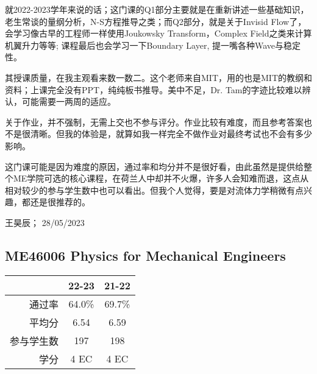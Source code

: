 就2022-2023学年来说的话；这门课的Q1部分主要就是在重新讲述一些基础知识，老生常谈的量纲分析，N-S方程推导之类；而Q2部分，就是关于Invisid Flow了，会学习像古早的工程师一样使用Joukowsky Transform，Complex Field之类来计算机翼升力等等; 课程最后也会学习一下Boundary Layer, 提一嘴各种Wave与稳定性。

其授课质量，在我主观看来数一数二。这个老师来自MIT，用的也是MIT的教纲和资料；上课完全没有PPT，纯纯板书推导。美中不足，Dr. Tam的字迹比较难以辨认，可能需要一两周的适应。

关于作业，并不强制，无需上交也不参与评分。作业比较有难度，而且参考答案也不是很清晰。但我的体验是，就算如我一样完全不做作业对最终考试也不会有多少影响。

这门课可能是因为难度的原因，通过率和均分并不是很好看，由此虽然是提供给整个ME学院可选的核心课程，在荷兰人中却并不火爆，许多人会知难而退，这点从相对较少的参与学生数中也可以看出。但我个人觉得，要是对流体力学稍微有点兴趣，都还是很推荐的。

\begin{flushright}
王昊辰； 28/05/2023
\end{flushright}



\subsection{ME46006 Physics for Mechanical Engineers}
\begin{minipage}{0.45\textwidth}
\centering
{}
\end{minipage}%
\begin{minipage}{0.45\textwidth}
\raggedleft
\begin{tabular}{r|c|c}
\textbf{ } & \textbf{22-23} & \textbf{21-22}\\ \hline
通过率 & 64.0\% & 69.7\%\\ 
平均分 & 6.54 & 6.59\\ 
参与学生数 & 197 & 198\\ 
学分 & 4 EC & 4 EC\\
\end{tabular}
\end{minipage}\\


